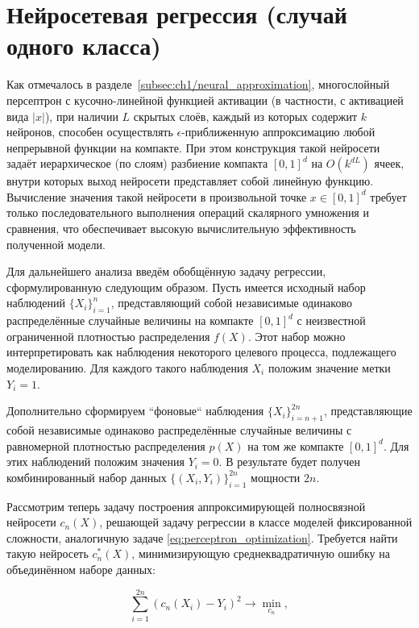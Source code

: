 \section{Нейросетевая регрессия (случай одного класса)}

Как отмечалось в разделе~\cref{subsec:ch1/neural_approximation}, многослойный персептрон с кусочно-линейной функцией активации (в частности, с активацией вида \(|x|\)), при наличии \(L\) скрытых слоёв, каждый из которых содержит \(k\) нейронов, способен осуществлять \(\epsilon\)-приближенную аппроксимацию любой непрерывной функции на компакте. При этом конструкция такой нейросети задаёт иерархическое (по слоям) разбиение компакта \([0, 1]^d\) на \(O(k^{dL})\) ячеек, внутри которых выход нейросети представляет собой линейную функцию. Вычисление значения такой нейросети в произвольной точке \(x \in [0, 1]^d\) требует только последовательного выполнения операций скалярного умножения и сравнения, что обеспечивает высокую вычислительную эффективность полученной модели.

Для дальнейшего анализа введём обобщённую задачу регрессии, сформулированную следующим образом. Пусть имеется исходный набор наблюдений \(\{X_i\}_{i=1}^n\), представляющий собой независимые одинаково распределённые случайные величины на компакте \([0, 1]^d\) с неизвестной ограниченной плотностью распределения \(f(X)\). Этот набор можно интерпретировать как наблюдения некоторого целевого процесса, подлежащего моделированию. Для каждого такого наблюдения \(X_i\) положим значение метки \(Y_i = 1\).

Дополнительно сформируем ``фоновые`` наблюдения \(\{X_i\}_{i=n+1}^{2n}\), представляющие собой независимые одинаково распределённые случайные величины с равномерной плотностью распределения \(p(X)\) на том же компакте \([0,1]^d\). Для этих наблюдений положим значения \(Y_i = 0\). В результате будет получен комбинированный набор данных \(\{(X_i, Y_i)\}_{i=1}^{2n}\) мощности \(2n\).

Рассмотрим теперь задачу построения аппроксимирующей полносвязной нейросети \(c_n(X)\), решающей задачу регрессии в классе моделей фиксированной сложности, аналогичную задаче \cref{eq:perceptron_optimization}. Требуется найти такую нейросеть \(c_n^*(X)\), минимизирующую среднеквадратичную ошибку на объединённом наборе данных:

\begin{equation}
    \label{eq:unary_perceptron_optimization}
    \sum_{i=1}^{2n} \left(c_n(X_i) - Y_i\right)^2 \rightarrow \min_{c_n},
\end{equation}

